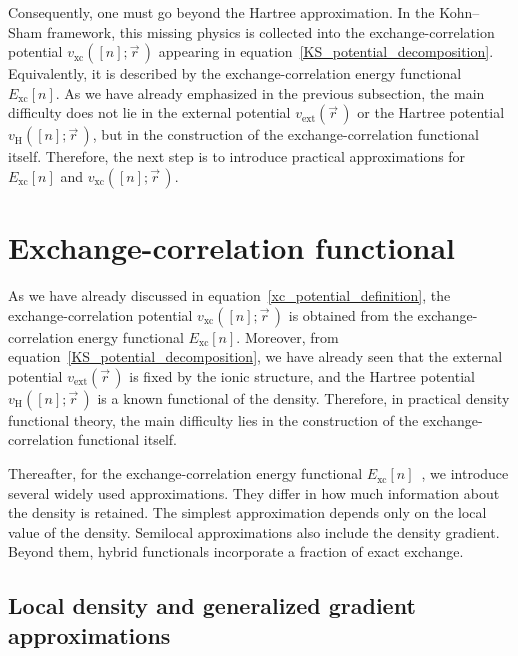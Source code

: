 Consequently, one must go beyond the Hartree approximation.
In the Kohn--Sham framework, this missing physics is collected into the exchange-correlation potential $v_\mathrm{xc}([n];\vec{r}\,)$ appearing in equation~\eqref{KS_potential_decomposition}.
Equivalently, it is described by the exchange-correlation energy functional $E_\mathrm{xc}[n]$.
As we have already emphasized in the previous subsection,
the main difficulty does not lie in the external potential $v_\mathrm{ext}(\vec{r}\,)$ or the Hartree potential $v_\mathrm{H}([n];\vec{r}\,)$,
but in the construction of the exchange-correlation functional itself.
Therefore, the next step is to introduce practical approximations for $E_\mathrm{xc}[n]$ and $v_\mathrm{xc}([n];\vec{r}\,)$.

\newpage
\FloatBarrier
\section{Exchange-correlation functional}
\label{sec:exchange_correlation_functional}

As we have already discussed in equation~\eqref{xc_potential_definition},
the exchange-correlation potential $v_\mathrm{xc}([n];\vec{r}\,)$ is obtained from the exchange-correlation energy functional $E_\mathrm{xc}[n]$.
Moreover, from equation~\eqref{KS_potential_decomposition},
we have already seen that the external potential $v_\mathrm{ext}(\vec{r}\,)$ is fixed by the ionic structure,
and the Hartree potential $v_\mathrm{H}([n];\vec{r}\,)$ is a known functional of the density.
Therefore, in practical density functional theory,
the main difficulty lies in the construction of the exchange-correlation functional itself.

Thereafter, for the exchange-correlation energy functional $E_\mathrm{xc}[n]$~\cite{martin2020electronic}, we introduce several widely used approximations.
They differ in how much information about the density is retained.
The simplest approximation depends only on the local value of the density.
Semilocal approximations also include the density gradient.
Beyond them, hybrid functionals incorporate a fraction of exact exchange.

\FloatBarrier
\subsection{Local density and generalized gradient approximations}

